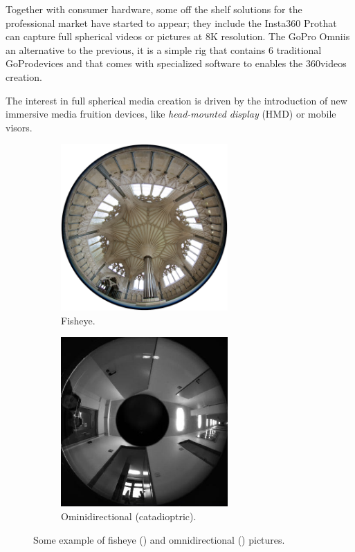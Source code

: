 Together with consumer hardware, some off the shelf
solutions for the professional market have started to appear; they include the Insta360
Pro\registered that can capture full spherical videos or pictures
at 8K resolution.
The GoPro Omni\registered is an alternative to the previous, it is a simple 
rig that contains 6 traditional GoPro\registered devices and that comes with 
specialized software to enables the 360\degree videos 
creation.

The interest in full spherical media creation is driven by the introduction 
of  new immersive media fruition devices, like 
\textit{head-mounted display} (HMD) or mobile visors.
\begin{figure}
	\centering
	\begin{subfigure}{0.4\textwidth}
		\centering
		\includegraphics[width=0.7\textwidth]{img/fisheye_example}
		\caption{Fisheye.}\label{fig:fisheye_example}
	\end{subfigure}
	\begin{subfigure}{0.4\textwidth}
		\centering
		\includegraphics[width=0.7\textwidth]{img/omnidirectional_example}
		\caption{Ominidirectional (catadioptric).}\label{fig:omnidirectional_example}
	\end{subfigure}
	\caption{Some example of fisheye () and omnidirectional () pictures.}\label{fig:wide_fov_pics}
\end{figure}

